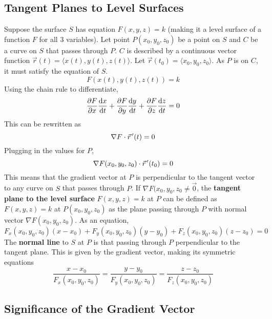 \documentclass[../Calculus_\Roman{3}]{subfiles}
\begin{document}
		\subsection*{Tangent Planes to Level Surfaces}
			Suppose the surface $S$ has equation $F(x, y, z) = k$ (making it a level surface of a function $F$ for all 3 variables). Let point $P(x_0, y_0, z_0)$ be a point on $S$ and $C$ be a curve on $S$ that passes through $P$. $C$ is described by a continuous vector function $\vec{r}(t) = \langle x(t), y(t), z(t) \rangle$. Let $\vec{r}(t_0) = \langle x_0, y_0, z_0 \rangle$. As $P$ is on $C$, it must satisfy the equation of $S$.
				\[F(x(t), y(t), z(t)) = k\]
				Using the chain rule to differentiate,
					\[\frac{\partial F}{\partial x}\frac{\mathrm{d} x}{\mathrm{d} t} + \frac{\partial F}{\partial y}\frac{\mathrm{d} y}{\mathrm{d} t} + \frac{\partial F}{\partial z}\frac{\mathrm{d} z}{\mathrm{d} t} = 0\]
				This can be rewritten as
				\[\nabla F \cdot \vec{r}\hspace{0.5mm}'(t) = 0\]
				Plugging in the values for $P$,
					\[\nabla F(x_0, y_0, z_0) \cdot \vec{r}\hspace{0.5mm}'(t_0) = 0\]
				This means that the gradient vector at $P$ is perpendicular to the tangent vector to any curve on $S$ that passes through $P$. If $\nabla F(x_0, y_0, z_0 \ne \vec{0}$, the \textbf{tangent plane to the level surface} $F(x, y, z) = k$ at $P$ can be defined as $F(x, y, z) = k$ at $P(x_0, y_0, z_0)$ as the plane passing through $P$ with normal vector $\nabla F(x_0, y_0, z_0)$. As an equation,
					\[F_x(x_0, y_0, z_0)(x - x_0) + F_y(x_0, y_0, z_0)(y - y_0) + F_z(x_0, y_0, z_0)(z - z_0) = 0\]
			The \textbf{normal line} to $S$ at $P$ is that passing through $P$ perpendicular to the tangent plane. This is given by the gradient vector, making its symmetric equations
				\[\frac{x - x_0}{F_x(x_0, y_0, z_0)} = \frac{y - y_0}{F_y(x_0, y_0, z_0)} = \frac{z - z_0}{F_z(x_0, y_0, z_0)}\]
		\subsection*{Significance of the Gradient Vector}
\end{document}
